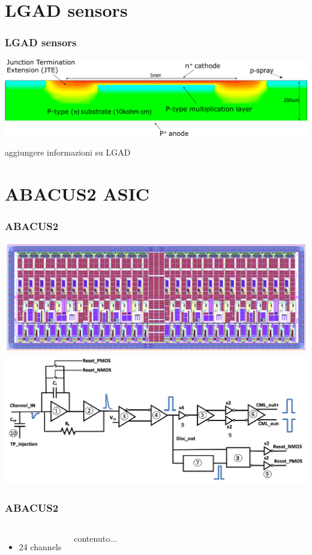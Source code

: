 \documentclass[aspectratio=169]{beamer}
\begin{document}
	\section{LGAD sensors}
	
	\begin{frame}
	\frametitle{LGAD sensors}
		\begin{center}
			\includegraphics[width=0.9 \textwidth]{IMG/LGAD_image.PNG}
		\end{center}
		{\color{red} aggiungere informazioni su LGAD}
	\end{frame}

	\section{ABACUS2 ASIC}
	
	\begin{frame}
	\frametitle{ABACUS2}
		\begin{center}
			\includegraphics[width=0.6 \textwidth]{IMG/ABACUS.PNG}
			\includegraphics[width=0.6 \textwidth]{IMG/ABACUS_channel.PNG}
		\end{center}
	\end{frame}

	\begin{frame}
	\frametitle{ABACUS2}
		\begin{columns}
			\column{0.5 \textwidth}
			\begin{itemize}
				\item 24 channels
			\end{itemize}
			\column{0.5 \textwidth}
			\begin{center}
				contenuto...
			\end{center}
		\end{columns}
	\end{frame}
\end{document}
